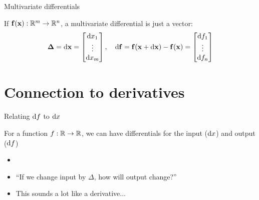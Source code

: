 \documentclass[8pt, aspectratio=149]{beamer}
\begin{document}
\begin{frame}{Multivariate differentials}

    If \( \mVector{f}(\mVector{x}): \R^m \to \R^n \), a multivariate differential is just a vector: 
    \begin{align*}
        \mVector{\Delta} = \diff \mVector{x} 
        = \begin{bmatrix}
            \diff x_1 \\ \vdots \\ \diff x_m
        \end{bmatrix}, 
        ~~~
        \diff \mVector{f} = \mVector{f}(\mVector{x} + \diff \mVector{x}) - \mVector{f}(\mVector{x}) 
        = \begin{bmatrix}
            \diff f_1 \\ \vdots \\ \diff f_n 
        \end{bmatrix}
    \end{align*}

\end{frame}



\section{Connection to derivatives} 
\begin{frame}{Relating \( \mathrm{d} f \) to \( \mathrm{d} x \)}

    For a function \( f: \mathbb{R} \to \mathbb{R} \), we can have differentials for the input (\( \mathrm{d} x \)) and output (\( \mathrm{d} f \))  
    \begin{itemize}
        \item {} 
        \item ``If we change input by \( \Delta \), how will output change?'' 
        \item This sounds a lot like a derivative...  
    \end{itemize}

\end{frame}
\end{document}
